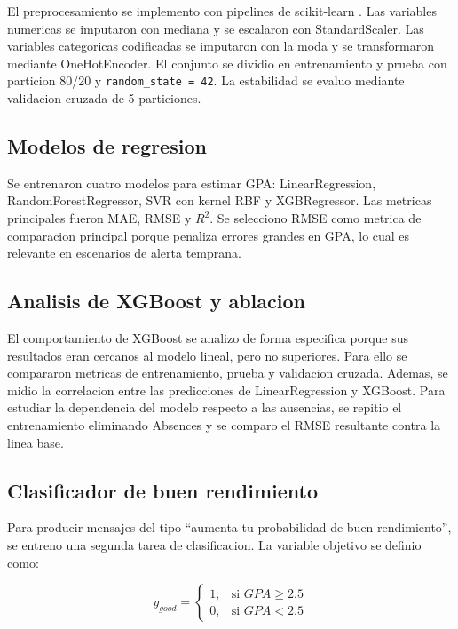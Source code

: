 \documentclass[12pt,onecolumn]{IEEEtran}
\begin{document}
El preprocesamiento se implemento con pipelines de scikit-learn \cite{pedregosa2011scikit}. Las variables numericas se imputaron con mediana y se escalaron con StandardScaler. Las variables categoricas codificadas se imputaron con la moda y se transformaron mediante OneHotEncoder. El conjunto se dividio en entrenamiento y prueba con particion 80/20 y \texttt{random\_state = 42}. La estabilidad se evaluo mediante validacion cruzada de 5 particiones.

\subsection{Modelos de regresion}

Se entrenaron cuatro modelos para estimar GPA: LinearRegression, RandomForestRegressor, SVR con kernel RBF y XGBRegressor. Las metricas principales fueron MAE, RMSE y $R^2$. Se selecciono RMSE como metrica de comparacion principal porque penaliza errores grandes en GPA, lo cual es relevante en escenarios de alerta temprana.

\subsection{Analisis de XGBoost y ablacion}

El comportamiento de XGBoost se analizo de forma especifica porque sus resultados eran cercanos al modelo lineal, pero no superiores. Para ello se compararon metricas de entrenamiento, prueba y validacion cruzada. Ademas, se midio la correlacion entre las predicciones de LinearRegression y XGBoost. Para estudiar la dependencia del modelo respecto a las ausencias, se repitio el entrenamiento eliminando Absences y se comparo el RMSE resultante contra la linea base.

\subsection{Clasificador de buen rendimiento}

Para producir mensajes del tipo ``aumenta tu probabilidad de buen rendimiento'', se entreno una segunda tarea de clasificacion. La variable objetivo se definio como:

\begin{equation}
y_{good} =
\begin{cases}
1, & \text{si } GPA \geq 2.5\\
0, & \text{si } GPA < 2.5
\end{cases}
\end{equation}
\end{document}
